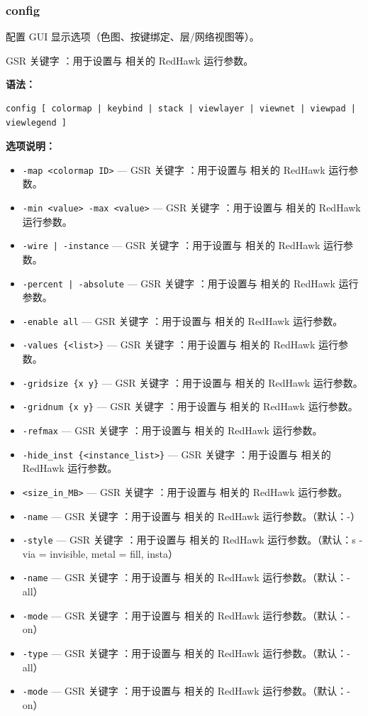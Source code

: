\subsubsection*{config}

配置 GUI 显示选项（色图、按键绑定、层/网络视图等）。

GSR 关键字 ：用于设置与  相关的 RedHawk 运行参数。

\textbf{语法：}
\begin{lstlisting}
config [ colormap | keybind | stack | viewlayer | viewnet | viewpad | viewlegend ]
\end{lstlisting}

\textbf{选项说明：}
\begin{itemize}
\item \texttt{-map <colormap ID>} — GSR 关键字 ：用于设置与  相关的 RedHawk 运行参数。
\item \texttt{-min <value> -max <value>} — GSR 关键字 ：用于设置与  相关的 RedHawk 运行参数。
\item \texttt{-wire | -instance} — GSR 关键字 ：用于设置与  相关的 RedHawk 运行参数。
\item \texttt{-percent | -absolute} — GSR 关键字 ：用于设置与  相关的 RedHawk 运行参数。
\item \texttt{-enable all} — GSR 关键字 ：用于设置与  相关的 RedHawk 运行参数。
\item \texttt{-values \{<list>\}} — GSR 关键字 ：用于设置与  相关的 RedHawk 运行参数。
\item \texttt{-gridsize \{x y\}} — GSR 关键字 ：用于设置与  相关的 RedHawk 运行参数。
\item \texttt{-gridnum \{x y\}} — GSR 关键字 ：用于设置与  相关的 RedHawk 运行参数。
\item \texttt{-refmax} — GSR 关键字 ：用于设置与  相关的 RedHawk 运行参数。
\item \texttt{-hide\_inst \{<instance\_list>\}} — GSR 关键字 ：用于设置与  相关的 RedHawk 运行参数。
\item \texttt{<size\_in\_MB>} — GSR 关键字 ：用于设置与  相关的 RedHawk 运行参数。
\item \texttt{-name} — GSR 关键字 ：用于设置与  相关的 RedHawk 运行参数。（默认：-）
\item \texttt{-style} — GSR 关键字 ：用于设置与  相关的 RedHawk 运行参数。（默认：s - via = invisible, metal = fill, insta）
\item \texttt{-name} — GSR 关键字 ：用于设置与  相关的 RedHawk 运行参数。（默认：- all）
\item \texttt{-mode} — GSR 关键字 ：用于设置与  相关的 RedHawk 运行参数。（默认：- on）
\item \texttt{-type} — GSR 关键字 ：用于设置与  相关的 RedHawk 运行参数。（默认：- all）
\item \texttt{-mode} — GSR 关键字 ：用于设置与  相关的 RedHawk 运行参数。（默认：- on）
\end{itemize}

